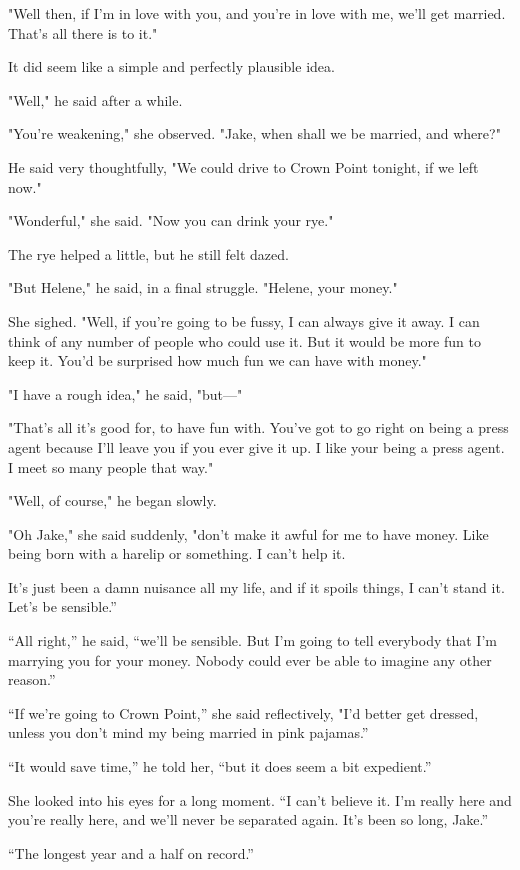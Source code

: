 \documentclass{novel}
\begin{document}
"Well then, if I'm in love with you, and you're in love with me, we'll get married. That's all there is to it."

It did seem like a simple and perfectly plausible idea.

"Well," he said after a while.

"You're weakening," she observed. "Jake, when shall we be married, and where?"

He said very thoughtfully, "We could drive to Crown Point tonight, if we left now."

"Wonderful," she said. "Now you can drink your rye."

The rye helped a little, but he still felt dazed.

"But Helene," he said, in a final struggle. "Helene, your money."

She sighed. "Well, if you're going to be fussy, I can always give it away. I can think of any number of people who could use it. But it would be more fun to keep it. You'd be surprised how much fun we can have with money."

"I have a rough idea," he said, "but—"

"That's all it's good for, to have fun with. You've got to go right on being a press agent because I'll leave you if you ever give it up. I like your being a press agent. I meet so many people that way."

"Well, of course," he began slowly.

"Oh Jake," she said suddenly, "don't make it awful for me to have money. Like being born with a harelip or something. I can't help it.

It’s just been a damn nuisance all my life, and if it spoils things, I can’t stand it. Let’s be sensible.”

“All right,” he said, “we’ll be sensible. But I’m going to tell everybody that I'm marrying you for your money. Nobody could ever be able to imagine any other reason.”

“If we’re going to Crown Point,” she said reflectively, "I'd better get dressed, unless you don’t mind my being married in pink pajamas.”

“It would save time,” he told her, “but it does seem a bit expedient.”

She looked into his eyes for a long moment. “I can’t believe it. I'm really here and you’re really here, and we’ll never be separated again. It’s been so long, Jake.”

“The longest year and a half on record.”
\end{document}
